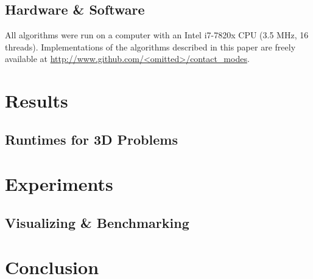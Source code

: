 \documentclass[conference]{IEEEtran}
\begin{document}
\subsection{Hardware \& Software}
All algorithms were run on a computer with an Intel i7-7820x CPU (3.5 MHz, 16
threads). Implementations of the algorithms described in this paper are freely
available at \url{http://www.github.com/<omitted>/contact_modes}.

\section{Results}

\subsection{Runtimes for 3D Problems}

\section{Experiments}

\subsection{Visualizing \& Benchmarking}

\section{Conclusion}


% 

\end{document}
